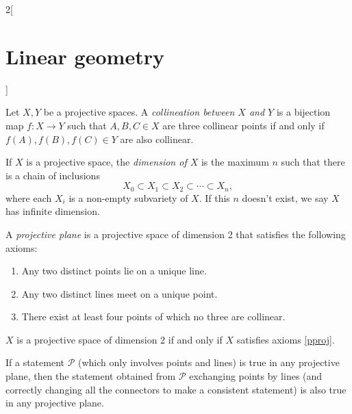 \documentclass[../../../main.tex]{subfiles}
\begin{document}
\begin{multicols}{2}[\section{Linear geometry}]
\begin{prop}
  \end{prop}
  \begin{definition}
    Let $X,Y$ be a projective spaces. A \textit{collineation between $X$ and $Y$} is a bijection map $f:X\rightarrow Y$ such that $A,B,C\in X$ are three collinear points if and only if $f(A),f(B),f(C)\in Y$ are also collinear.
  \end{definition}
  \begin{definition}
    If $X$ is a projective space, the \textit{dimension of $X$} is the maximum $n$ such that there is a chain of inclusions $$X_0\subset X_1\subset X_2 \subset\cdots\subset X_n,$$ where each $X_i$ is a non-empty subvariety of $X$. If this $n$ doesn't exist, we say $X$ has infinite dimension.
  \end{definition}
  \begin{definition}
    \label{pproj}
    A \textit{projective plane} is a projective space of dimension 2 that satisfies the following axioms:
    \begin{enumerate}
      \item Any two distinct points lie on a unique line.
      \item Any two distinct lines meet on a unique point.
      \item There exist at least four points of which no three are collinear.
    \end{enumerate}
  \end{definition}
  \begin{theorem}
    $X$ is a projective space of dimension 2 if and only if $X$ satisfies axioms \ref{pproj}.
  \end{theorem}
  \begin{theorem}
    If a statement $\mathcal{P}$ (which only involves points and lines) is true in any projective plane, then the statement obtained from $\mathcal{P}$ exchanging points by lines (and correctly changing all the connectors to make a consistent statement) is also true in any projective plane.
  \end{theorem}

\end{multicols}
\end{document}

